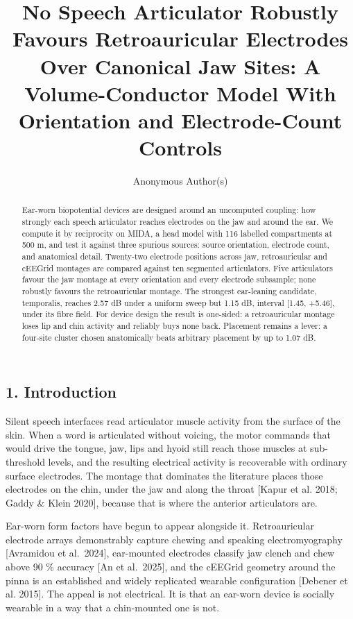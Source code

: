 \documentclass[manuscript,review,anonymous]{acmart}
\title{No Speech Articulator Robustly Favours Retroauricular Electrodes Over Canonical Jaw Sites: A Volume-Conductor Model With Orientation and Electrode-Count Controls}
\author{Anonymous Author(s)}
\affiliation{\institution{Anonymous}\country{Anonymous}}
\newcounter{none}
\begin{document}
\begin{abstract}
Ear-worn biopotential devices are designed around an uncomputed coupling: how strongly each speech articulator reaches electrodes on the jaw and around the ear. We compute it by reciprocity on MIDA, a head model with 116 labelled compartments at 500 \textmu{}m, and test it against three spurious sources: source orientation, electrode count, and anatomical detail. Twenty-two electrode positions across jaw, retroauricular and cEEGrid montages are compared against ten segmented articulators. Five articulators favour the jaw montage at every orientation and every electrode subsample; none robustly favours the retroauricular montage. The strongest ear-leaning candidate, temporalis, reaches \textminus{}2.57 dB under a uniform sweep but \textminus{}1.15 dB, interval {[}\textminus{}1.45, +5.46{]}, under its fibre field. For device design the result is one-sided: a retroauricular montage loses lip and chin activity and reliably buys none back. Placement remains a lever: a four-site cluster chosen anatomically beats arbitrary placement by up to 1.07 dB.

\end{abstract}
\maketitle
\subsection{1. Introduction}\label{introduction}

Silent speech interfaces read articulator muscle activity from the surface of
the skin. When a word is articulated without voicing, the motor commands that
would drive the tongue, jaw, lips and hyoid still reach those muscles at
sub-threshold levels, and the resulting electrical activity is recoverable with
ordinary surface electrodes. The montage that dominates the literature places
those electrodes on the chin, under the jaw and along the throat {[}Kapur et al.
2018; Gaddy \& Klein 2020{]}, because that is where the anterior articulators are.

Ear-worn form factors have begun to appear alongside it. Retroauricular
electrode arrays demonstrably capture chewing and speaking electromyography
{[}Avramidou et al.~2024{]}, ear-mounted electrodes classify jaw clench and chew
above 90 \% accuracy {[}An et al.~2025{]}, and the cEEGrid geometry around the pinna
is an established and widely replicated wearable configuration {[}Debener et al.
2015{]}. The appeal is not electrical. It is that an ear-worn device is socially
wearable in a way that a chin-mounted one is not.
\end{document}
